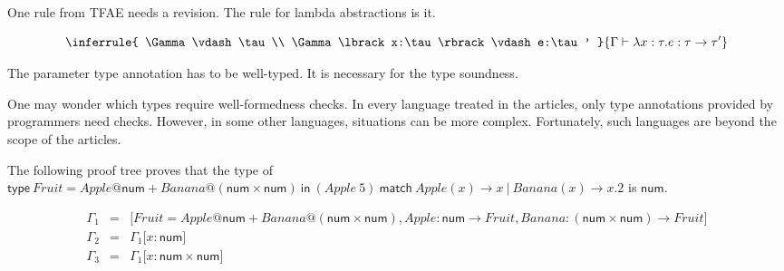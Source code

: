 One rule from TFAE needs a revision. The rule for lambda abstractions is it.

\[
\inferrule
{ \Gamma\vdash\tau \\ \Gamma\lbrack x:\tau\rbrack\vdash e:\tau' }
{ \Gamma\vdash \lambda x:\tau.e:\tau\rightarrow\tau' }
\]

The parameter type annotation has to be well-typed. It is necessary for the type
soundness.

One may wonder which types require well-formedness checks. In every language
treated in the articles, only type annotations provided by programmers need
checks. However, in some other languages, situations can be more complex.
Fortunately, such languages are beyond the scope of the articles.

The following proof tree proves that the type of $\textsf{type}\
Fruit=Apple@\textsf{num}+Banana@(\textsf{num}\times\textsf{num})\ \textsf{in}\
(Apple\ 5)\ \textsf{match}\ Apple(x)\rightarrow x\ |\ Banana(x)\rightarrow x.2$
is $\textsf{num}$.

\[
\begin{array}{rcl}
\Gamma_1&=&\lbrack
Fruit=Apple@\textsf{num}+Banana@(\textsf{num}\times\textsf{num}),
Apple:\textsf{num}\rightarrow Fruit,
Banana:(\textsf{num}\times\textsf{num})\rightarrow Fruit\rbrack \\
\Gamma_2&=&\Gamma_1\lbrack x:\textsf{num}\rbrack \\
\Gamma_3&=&\Gamma_1\lbrack x:\textsf{num}\times\textsf{num}\rbrack
\end{array}
\]

